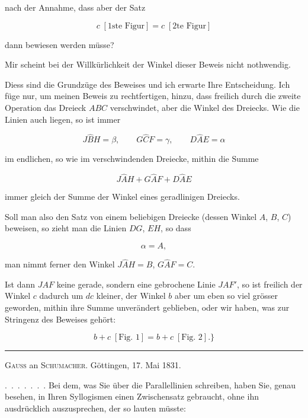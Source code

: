 %
\noindent nach der Annahme, dass aber der Satz

\[ c\;[\text{1ste Figur}] = c\;[\text{2te Figur}] \]

\noindent dann bewiesen werden müsse?

Mir scheint bei der Willkürlichkeit der Winkel dieser Beweis nicht nothwendig.

Diess sind die Grundzüge des Beweises und ich erwarte Ihre Entscheidung. Ich füge nur, um meinen Beweis zu rechtfertigen, hinzu, dass freilich durch die zweite Operation das Dreieck $ABC$ verschwindet, aber  die Winkel des Dreiecks. Wie die Linien auch liegen, so ist immer

\[ J\hat{B}H = \beta, \qquad G\hat{C}F = \gamma, \qquad D\hat{A}E = \alpha \]

\noindent im endlichen, so wie im verschwindenden Dreiecke, mithin die Summe

\[ J\hat{A}H + G\hat{A}F + D\hat{A}E \]

\noindent immer gleich der Summe der Winkel eines geradlinigen Dreiecks.

Soll man also den Satz von einem beliebigen Dreiecke (dessen Winkel $A$, $B$, $C$) beweisen, so zieht man die Linien $DG$, $EH$, so dass

\[ \alpha = A, \]

\noindent man nimmt ferner den Winkel $J\hat{A}H = B$, $G\hat{A}F = C$.

Ist dann $JAF$ keine gerade, sondern eine gebrochene Linie $JAF'$, so ist freilich der Winkel $c$ dadurch um $dc$ kleiner, der Winkel $b$ aber um eben so viel grösser geworden, mithin ihre Summe unverändert geblieben, oder wir haben, was zur Stringenz des Beweises gehört:

\[ b + c\;[\text{Fig. 1}] = b + c\;[\text{Fig. 2}].\} \]

\bigskip
\hrule
\bigskip

\begin{center}
\textsc{Gauss} an \textsc{Schumacher}. Göttingen, 17. Mai 1831.
\end{center}

\mbox{.\ .\ .\ .\ .\ .\ .} Bei dem, was Sie über die Parallellinien schreiben, haben Sie, genau besehen, in Ihren Syllogismen einen Zwischensatz gebraucht, ohne ihn ausdrücklich auszusprechen, der so lauten müsste:
